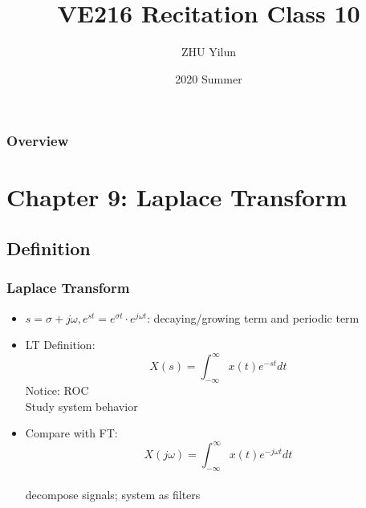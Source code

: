 \documentclass{beamer}
\title[VE216]{VE216 Recitation Class 10} %
\author{ZHU Yilun} %
\institute[SJTU] %
{
UM-SJTU Joint Institute \\ %
\medskip
\textit{VE216 SU20 TA Group} %
}
\date{2020 Summer} %
\begin{document}
\begin{frame}
\titlepage %
\end{frame}

\begin{frame}
\frametitle{Overview} %
\tableofcontents %
\end{frame}



\section{Chapter 9: Laplace Transform}

\subsection{Definition}
\begin{frame}
    \frametitle{Laplace Transform}
    \begin{itemize}
        \item $s = \sigma + j \omega, e^{st} = e^{\sigma t} \cdot e^{j \omega t}$: decaying/growing term and periodic term
        \item LT Definition: 
        \[ X(s) = \int_{- \infty}^{\infty} x(t) e^{-st} dt \]
        Notice: ROC \\
        Study system behavior
        \item Compare with FT:  \[ X(j \omega) = \int_{- \infty}^{\infty} x(t) e^{-j \omega t} dt \] \\
        decompose signals; system as filters
    \end{itemize}
\end{frame}
\end{document}
